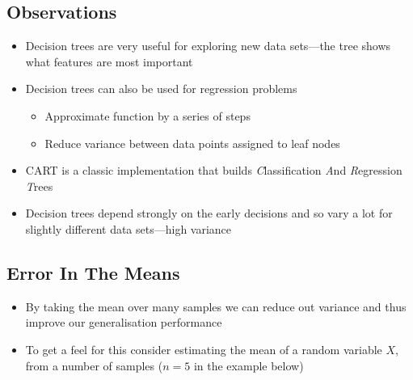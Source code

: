 
\begin{slide}
\section{Observations}

\begin{PauseHighLight}
  \begin{itemize}
  \item Decision trees are very useful for exploring new data
    sets\pause---the tree shows what features are most
    important\pause
  \item Decision trees can also be used for regression problems\pause
    \begin{itemize}
    \item Approximate function by a series of steps\pause
    \item Reduce variance between data points assigned to leaf
      nodes\pause
    \end{itemize}
  \item CART is a classic implementation that builds
    \emph{C}lassification \emph{A}nd \emph{R}egression
    \emph{T}rees\pause
  \item Decision trees depend strongly on the early decisions and so
    vary a lot for slightly different data sets\pause---high variance\pauseb
  \end{itemize}
\end{PauseHighLight}

\end{slide}

\Outline %


\begin{slide}
  \section[-2]{Error In The Means}
  \pb
  \begin{itemize}
  \item By taking the mean over many samples we can reduce out
    variance and thus improve our generalisation performance\pauseh
  \item To get a feel for this consider estimating the mean of a
    random variable $X$, from a number of samples ($n=5$ in the
    example below)\pauseh    
  \end{itemize}
    \begin{center}
      \pause
    \end{center}
\end{slide}

